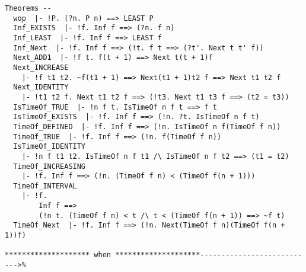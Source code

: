 \begin{verbatim}
Theorems --
  wop  |- !P. (?n. P n) ==> LEAST P
  Inf_EXISTS  |- !f. Inf f ==> (?n. f n)
  Inf_LEAST  |- !f. Inf f ==> LEAST f
  Inf_Next  |- !f. Inf f ==> (!t. f t ==> (?t'. Next t t' f))
  Next_ADD1  |- !f t. f(t + 1) ==> Next t(t + 1)f
  Next_INCREASE
    |- !f t1 t2. ~f(t1 + 1) ==> Next(t1 + 1)t2 f ==> Next t1 t2 f
  Next_IDENTITY
    |- !t1 t2 f. Next t1 t2 f ==> (!t3. Next t1 t3 f ==> (t2 = t3))
  IsTimeOf_TRUE  |- !n f t. IsTimeOf n f t ==> f t
  IsTimeOf_EXISTS  |- !f. Inf f ==> (!n. ?t. IsTimeOf n f t)
  TimeOf_DEFINED  |- !f. Inf f ==> (!n. IsTimeOf n f(TimeOf f n))
  TimeOf_TRUE  |- !f. Inf f ==> (!n. f(TimeOf f n))
  IsTimeOf_IDENTITY
    |- !n f t1 t2. IsTimeOf n f t1 /\ IsTimeOf n f t2 ==> (t1 = t2)
  TimeOf_INCREASING
    |- !f. Inf f ==> (!n. (TimeOf f n) < (TimeOf f(n + 1)))
  TimeOf_INTERVAL
    |- !f.
        Inf f ==>
        (!n t. (TimeOf f n) < t /\ t < (TimeOf f(n + 1)) ==> ~f t)
  TimeOf_Next  |- !f. Inf f ==> (!n. Next(TimeOf f n)(TimeOf f(n + 1))f)
  
******************** when ********************--------------------------->%
\end{verbatim}
